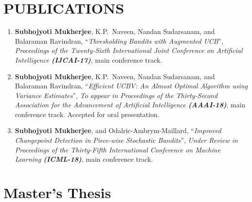 \documentclass[margin,11pt]{res}
\begin{document}
\begin{resume}
\section{PUBLICATIONS}
\begin{enumerate}[leftmargin=*]
\item \textbf{Subhojyoti Mukherjee}, K.P.~Naveen, Nandan Sudarsanam, and Balaraman Ravindran, ``\textit{Thresholding Bandits with Augmented UCB}'', \textit{Proceedings of the Twenty-Sixth International Joint Conference on Artificial Intelligence \textbf{(IJCAI-17)}}, main conference track.
\item \textbf{Subhojyoti Mukherjee}, K.P.~Naveen, Nandan Sudarsanam, and Balaraman Ravindran, ``\textit{Efficient UCBV: An Almost Optimal Algorithm using Variance Estimates}'', \textit{To appear in Proceedings of the Thirty-Second Association for the Advancement of Artificial Intelligence \textbf{(AAAI-18)}}, main conference track. Accepted for oral presentation.
\item \textbf{Subhojyoti Mukherjee}, and Odalric-Ambrym-Maillard, ``\textit{Improved Changepoint Detection in Piece-wise Stochastic Bandits}'', \textit{Under Review in Proceedings of the Thirty-Fifth International  Conference on Machine Learning \textbf{(ICML-18)}}, main conference track.
\end{enumerate}

\section{Master's Thesis}


\end{resume}
\end{document}
